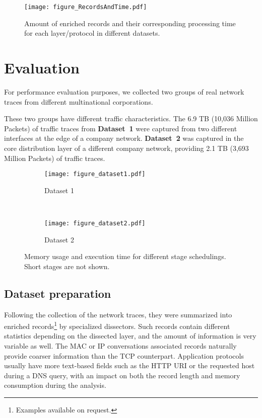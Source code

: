 \documentclass[AMA,STIX1COL]{WileyNJD-v2}
\begin{document}
\begin{figure}[b]
\centering
\texttt{[image: figure\_RecordsAndTime.pdf]}
\caption{Amount of enriched records and their corresponding processing time for each layer/protocol in different datasets.}
\label{fig:stage_times}
\end{figure}

\section{Evaluation}
\label{sec:meth}

For performance evaluation purposes, we collected two groups of real network traces from different multinational corporations.  

These two groups have different traffic characteristics. The 6.9 TB (10,036 Million Packets) of traffic traces from \textbf{Dataset~1} were captured from two different interfaces at the edge of a company network. \textbf{Dataset~2} was captured in the core distribution layer of a different company network, providing 2.1 TB (3,693 Million Packets) of traffic traces.  %

\begin{figure*}[b]
\centering
\begin{subfigure}{0.5\columnwidth}
 \centering
 \texttt{[image: figure\_dataset1.pdf]}
 \caption{Dataset 1}   \end{subfigure}%
~
\begin{subfigure}{0.5\columnwidth}
 \centering
 \texttt{[image: figure\_dataset2.pdf]}
 \caption{Dataset 2}   \end{subfigure}%
\vspace{-0.5em}
\caption{Memory usage and execution time for different stage schedulings. Short stages are not shown.}
\label{fig:schedulings}
\end{figure*}

\subsection{Dataset preparation}

Following the collection of the network traces, they were summarized into enriched records\footnote{Examples available on request.} by specialized dissectors. Such records contain different statistics depending on the dissected layer, and the amount of information is very variable as well. The MAC or IP conversations associated records naturally provide coarser information than the TCP counterpart. Application protocols usually have more text-based fields such as the HTTP URI or the requested host during a DNS query, with an impact on both the record length and memory consumption during the analysis.
\end{document}
